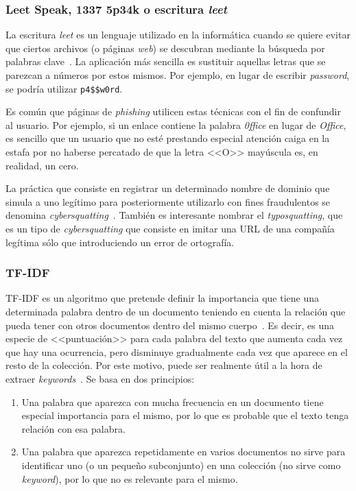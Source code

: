 \subsubsection{Leet Speak, 1337 5p34k o escritura \textit{leet}}

La escritura \textit{leet} es un lenguaje utilizado en la informática cuando se quiere evitar que ciertos archivos (o páginas \textit{web}) se descubran mediante la búsqueda por palabras clave~\cite{leetSpectrum}. La aplicación más sencilla es sustituir aquellas letras que se parezcan a números por estos mismos. Por ejemplo, en lugar de escribir \textit{password}, se podría utilizar \texttt{p4\$\$w0rd}.

Es común que páginas de \textit{phishing} utilicen estas técnicas con el fin de confundir al usuario. Por ejemplo, si un enlace contiene la palabra \textit{0ffice} en lugar de \textit{Office}, es sencillo que un usuario que no esté prestando especial atención caiga en la estafa por no haberse percatado de que la letra <<O>> mayúscula es, en realidad, un cero.

La práctica que consiste en registrar un determinado nombre de dominio que simula a uno legítimo para posteriormente utilizarlo con fines fraudulentos se denomina \textit{cybersquatting}~\cite{Incibecybsqua}. También es interesante nombrar el \textit{typosquatting}, que es un tipo de \textit{cybersquatting} que consiste en imitar una URL de una compañía legítima sólo que introduciendo un error de ortografía.

\subsubsection{TF-IDF}

TF-IDF es un algoritmo que pretende definir la importancia que tiene una determinada palabra dentro de un documento teniendo en cuenta la relación que pueda tener con otros documentos dentro del mismo cuerpo~\cite{tfidfmarius2020}. Es decir, es una especie de <<puntuación>> para cada palabra del texto que aumenta cada vez que hay una ocurrencia, pero disminuye gradualmente cada vez que aparece en el resto de la colección. Por este motivo, puede ser realmente útil a la hora de extraer \textit{keywords}~\cite{cantinatfidf}. Se basa en dos principios:

\begin{enumerate}
	\item Una palabra que aparezca con mucha frecuencia en un documento tiene especial importancia para el mismo, por lo que es probable que el texto tenga relación con esa palabra.
	\item Una palabra que aparezca repetidamente en varios documentos no sirve para identificar uno (o un pequeño subconjunto) en una colección (no sirve como \textit{keyword}), por lo que no es relevante para el mismo.
\end{enumerate}

